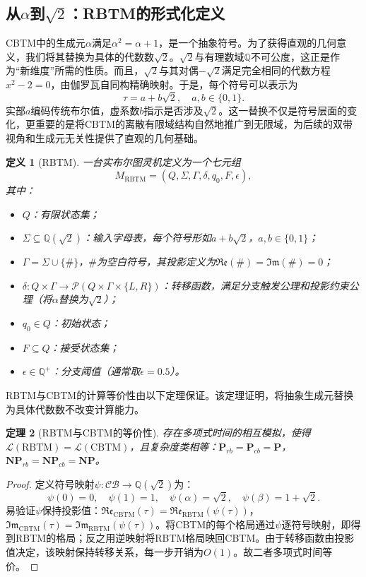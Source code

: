 \documentclass{ctexart}
\newtheorem{theorem}{定理}[section]
\newtheorem{definition}[theorem]{定义}
\newtheorem{proof}[theorem]{证明}
\begin{document}
	\subsection{从$\alpha$到$\sqrt{2}$：RBTM的形式化定义}
	
	CBTM中的生成元$\alpha$满足$\alpha^2=\alpha+1$，是一个抽象符号。为了获得直观的几何意义，我们将其替换为具体的代数数$\sqrt{2}$。$\sqrt{2}$与有理数域$\mathbb{Q}$不可公度，这正是作为``新维度''所需的性质。而且，$\sqrt{2}$与其对偶$-\sqrt{2}$满足完全相同的代数方程$x^2-2=0$，由伽罗瓦自同构精确映射。于是，每个符号可以表示为
	\[
	\tau = a + b\sqrt{2},\quad a,b\in\{0,1\}.
	\]
	实部$a$编码传统布尔值，虚系数$b$指示是否涉及$\sqrt{2}$。这一替换不仅是符号层面的变化，更重要的是将CBTM的离散有限域结构自然地推广到无限域，为后续的双带视角和生成元无关性提供了直观的几何基础。
	
	\begin{definition}[RBTM]\label{def:rbtm}
		一台实布尔图灵机定义为一个七元组
		\[
		M_{\mathrm{RBTM}} = (Q,\Sigma,\Gamma,\delta,q_0,F,\epsilon),
		\]
		其中：
		\begin{itemize}
			\item $Q$：有限状态集；
			\item $\Sigma \subseteq \mathbb{Q}(\sqrt{2})$：输入字母表，每个符号形如$a+b\sqrt{2}$，$a,b\in\{0,1\}$；
			\item $\Gamma = \Sigma \cup \{\#\}$，$\#$为空白符号，其投影定义为$\mathfrak{Re}(\#)=\mathfrak{Im}(\#)=0$；
			\item $\delta: Q\times\Gamma \to \mathcal{P}(Q\times\Gamma\times\{L,R\})$：转移函数，满足分支触发公理和投影约束公理（将$\alpha$替换为$\sqrt{2}$）；
			\item $q_0\in Q$：初始状态；
			\item $F\subseteq Q$：接受状态集；
			\item $\epsilon\in\mathbb{Q}^+$：分支阈值（通常取$\epsilon=0.5$）。
		\end{itemize}
	\end{definition}
	
	RBTM与CBTM的计算等价性由以下定理保证。该定理证明，将抽象生成元替换为具体代数数不改变计算能力。
	
	\begin{theorem}[RBTM与CBTM的等价性]\label{thm:rbtm-cbtm-equiv}
		存在多项式时间的相互模拟，使得$\mathcal{L}(\mathrm{RBTM})=\mathcal{L}(\mathrm{CBTM})$，且复杂度类相等：$\mathbf{P}_{rb}=\mathbf{P}_{cb}=\mathbf{P}$，$\mathbf{NP}_{rb}=\mathbf{NP}_{cb}=\mathbf{NP}$。
	\end{theorem}
	\begin{proof}
		定义符号映射$\psi:\mathcal{CB}\to\mathbb{Q}(\sqrt{2})$为：
		\[
		\psi(0)=0,\quad \psi(1)=1,\quad \psi(\alpha)=\sqrt{2},\quad \psi(\beta)=1+\sqrt{2}.
		\]
		易验证$\psi$保持投影值：$\mathfrak{Re}_{\mathrm{CBTM}}(\tau)=\mathfrak{Re}_{\mathrm{RBTM}}(\psi(\tau))$，$\mathfrak{Im}_{\mathrm{CBTM}}(\tau)=\mathfrak{Im}_{\mathrm{RBTM}}(\psi(\tau))$。将CBTM的每个格局通过$\psi$逐符号映射，即得到RBTM的格局；反之用逆映射将RBTM格局映回CBTM。由于转移函数由投影值决定，该映射保持转移关系，每一步开销为$O(1)$。故二者多项式时间等价。
	\end{proof}
	
\end{document}
